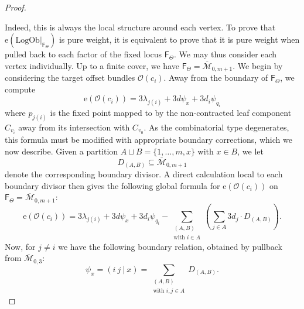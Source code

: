 \documentclass[11pt]{amsart}
\theoremstyle{definition}
\theoremstyle{definition}
\newcommand{\ol}[1]{\overline{#1}}
\newcommand{\e}{\mathrm{e}}
\newcommand{\OO}{\mathcal{O}}
\newcommand{\LogOb}{\mathrm{LogOb}}
\newcommand{\Mcal}{\mathcal{M}}
\newcommand{\Fup}{\mathsf{F}}
\begin{document}
\begin{proof}
\begin{center}
\end{center}
Indeed, this is always the local structure around each vertex. To prove that $\e(\LogOb|_{\Fup_\Theta})$ is pure weight, it is equivalent to prove that it is pure weight when pulled back to each factor of the fixed locus $\Fup_\Theta$. We may thus consider each vertex individually. Up to a finite cover, we have $\Fup_{\Theta}=\ol{\Mcal}_{0,m+1}$. We begin by considering the target offset bundles $\OO(c_i)$. Away from the boundary of $\Fup_{\Theta}$, we compute
\begin{equation*} \e (\OO(c_i)) = 3\lambda_{j(i)} + 3d \psi_x + 3d_i \psi_{q_i}\end{equation*}
where $p_{j(i)}$ is the fixed point mapped to by the non-contracted leaf component $C_{v_i}$ away from its intersection with $C_{v_0}$. As the combinatorial type degenerates, this formula must be modified with appropriate boundary corrections, which we now describe. Given a partition $A \sqcup B = \{1,\ldots,m,x\}$ with $x \in B$, we let 
\begin{equation*} D_{(A,B)} \subseteq \overline{\Mcal}_{0,m+1} \end{equation*}
denote the corresponding boundary divisor. A direct calculation local to each boundary divisor then gives the following global formula for $\e (\OO(c_i))$ on $\Fup_{\Theta}=\ol\Mcal_{0,m+1}$:
\begin{equation}\label{eqn: formula for O(ci)} \e (\OO(c_i)) = 3\lambda_{j(i)} + 3d \psi_x + 3d_i \psi_{q_i} - \sum_{\substack{(A,B) \\ \text{with } i \in A}} \left( \sum_{j \in A} 3d_j \cdot D_{(A,B)} \right).\end{equation}
Now, for $j \neq i$ we have the following boundary relation, obtained by pullback from $\ol\Mcal_{0,3}$:
\begin{equation*} \psi_x = ( i \ j\ |\ x) = \sum_{\substack{(A,B)\\ \text{with }i,j \in A}} D_{(A,B)}.\end{equation*}

\end{proof}
\end{document}
